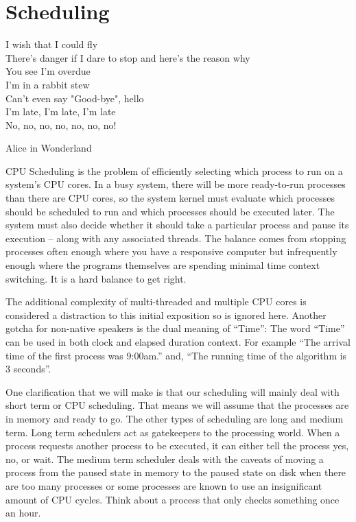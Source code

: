 \chapter{Scheduling}

\epigraph{I wish that I could fly\\
There's danger if I dare to stop and here's the reason why\\
You see I'm overdue\\
I'm in a rabbit stew\\
Can't even say "Good-bye", hello\\
I'm late, I'm late, I'm late\\
No, no, no, no, no, no, no!}{Alice in Wonderland}

CPU Scheduling is the problem of efficiently selecting which process to run on a system's CPU cores.
In a busy system, there will be more ready-to-run processes than there are CPU cores, so the system kernel must evaluate which processes should be scheduled to run and which processes should be executed later.
The system must also decide whether it should take a particular process and pause its execution -- along with any associated threads.
The balance comes from stopping processes often enough where you have a responsive computer but infrequently enough where the programs themselves are spending minimal time context switching.
It is a hard balance to get right.

The additional complexity of multi-threaded and multiple CPU cores is considered a distraction to this initial exposition so is ignored here.
Another gotcha for non-native speakers is the dual meaning of ``Time'': The word ``Time'' can be used in both clock and elapsed duration context.
For example ``The arrival time of the first process was 9:00am.'' and, ``The running time of the algorithm is 3 seconds''.

One clarification that we will make is that our scheduling will mainly deal with short term or CPU scheduling.
That means we will assume that the processes are in memory and ready to go.
The other types of scheduling are long and medium term.
Long term schedulers act as gatekeepers to the processing world.
When a process requests another process to be executed, it can either tell the process yes, no, or wait.
The medium term scheduler deals with the caveats of moving a process from the paused state in memory to the paused state on disk when there are too many processes or some processes are known to use an insignificant amount of CPU cycles.
Think about a process that only checks something once an hour.

